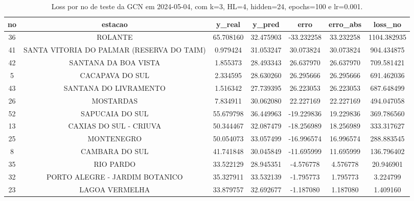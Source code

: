 \begin{table}[h]
\centering
\caption{Loss por no de teste da GCN em 2024-05-04, com k=3, HL=4, hidden=24, epochs=100 e lr=0.001.}
\label{tab:gcn_loss_k3_hl4_h24_e100_d20240504}
\begin{tabular}{ccccccc}
\toprule
no & estacao & y\_real & y\_pred & erro & erro\_abs & loss\_no \\
\midrule
36 & ROLANTE & 65.708160 & 32.475903 & -33.232258 & 33.232258 & 1104.382935 \\
41 & SANTA VITORIA DO PALMAR (RESERVA DO TAIM) & 0.979424 & 31.053247 & 30.073824 & 30.073824 & 904.434875 \\
42 & SANTANA DA BOA VISTA & 1.855373 & 28.493343 & 26.637970 & 26.637970 & 709.581421 \\
5 & CACAPAVA DO SUL & 2.334595 & 28.630260 & 26.295666 & 26.295666 & 691.462036 \\
43 & SANTANA DO LIVRAMENTO & 1.516342 & 27.739395 & 26.223053 & 26.223053 & 687.648499 \\
26 & MOSTARDAS & 7.834911 & 30.062080 & 22.227169 & 22.227169 & 494.047058 \\
52 & SAPUCAIA DO SUL & 55.679798 & 36.449963 & -19.229836 & 19.229836 & 369.786560 \\
13 & CAXIAS DO SUL - CRIUVA & 50.344467 & 32.087479 & -18.256989 & 18.256989 & 333.317627 \\
25 & MONTENEGRO & 50.054073 & 33.057499 & -16.996574 & 16.996574 & 288.883545 \\
8 & CAMBARA DO SUL & 41.741848 & 30.045849 & -11.695999 & 11.695999 & 136.796402 \\
35 & RIO PARDO & 33.522129 & 28.945351 & -4.576778 & 4.576778 & 20.946901 \\
32 & PORTO ALEGRE - JARDIM BOTANICO & 35.327911 & 33.532139 & -1.795773 & 1.795773 & 3.224799 \\
23 & LAGOA VERMELHA & 33.879757 & 32.692677 & -1.187080 & 1.187080 & 1.409160 \\
\bottomrule
\end{tabular}
\end{table}
